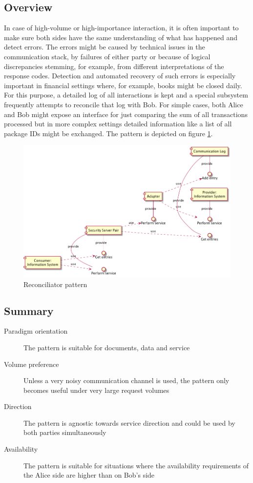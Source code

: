 \documentclass[10pt,a4paper]{article}
\begin{document}
\subsection{Overview}
In case of high-volume or high-importance interaction, it is often important to make sure both sides have the same understanding of what has happened and detect errors. The errors might be caused by technical issues in the communication stack, by failures of either party or because of logical discrepancies stemming, for example, from different interpretations of the response codes. Detection and automated recovery of such errors is especially important in financial settings where, for example, books might be closed daily. For this purpose, a detailed log of all interactions is kept and a special subsystem frequently attempts to reconcile that log with Bob. For simple cases, both Alice and Bob might expose an interface for just comparing the sum of all transactions processed but in more complex settings detailed information like a list of all package IDs might be exchanged. The pattern is depicted on figure \ref{fig:p:9}.
\begin{figure}[htp]
	\begin{center}
		\includegraphics[width=1\textwidth]{gfx/9_comp.png}
		\caption{Reconciliator pattern}
		\label{fig:p:9}
	\end{center}
\end{figure}

\subsection{Summary}
\begin{description}
	\item[Paradigm orientation] The pattern is suitable for documents, data and service
	\item[Volume preference] Unless a very noisy communication channel is used, the pattern only becomes useful under very large request volumes
	\item[Direction] The pattern is agnostic towards service direction and could be used by both parties simultaneously
	\item[Availability] The pattern is suitable for situations where the availability requirements of the Alice side are higher than on Bob's side
\end{description}
\end{document}
